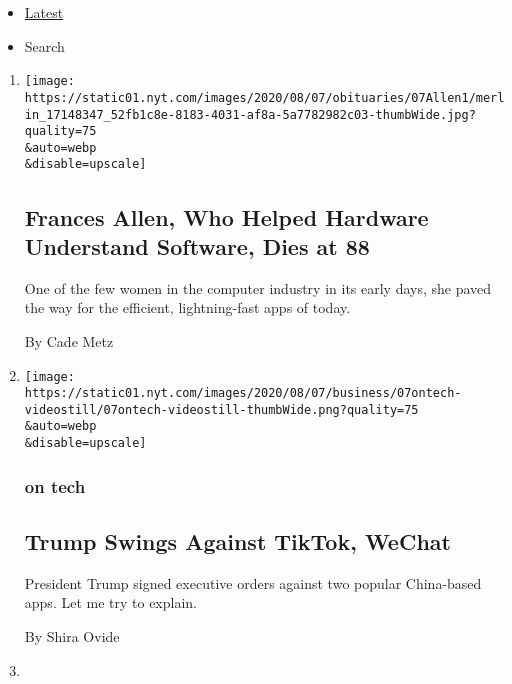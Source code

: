 \begin{itemize}
\tightlist
\item
  \protect\hyperlink{stream-panel}{Latest}
\item
  Search
\end{itemize}

\begin{enumerate}
\def\labelenumi{\arabic{enumi}.}
\item
  \href{/2020/08/08/technology/frances-allen-dead.html}{}

  \texttt{[image: https://static01.nyt.com/images/2020/08/07/obituaries/07Allen1/merlin\_17148347\_52fb1c8e-8183-4031-af8a-5a7782982c03-thumbWide.jpg?quality=75\\\&auto=webp\\\&disable=upscale]}

  \hypertarget{frances-allen-who-helped-hardware-understand-software-dies-at-88}{%
  \subsection{Frances Allen, Who Helped Hardware Understand Software,
  Dies at
  88}\label{frances-allen-who-helped-hardware-understand-software-dies-at-88}}

  One of the few women in the computer industry in its early days, she
  paved the way for the efficient, lightning-fast apps of today.

  By Cade Metz
\item
  \href{/2020/08/07/technology/trump-tiktok-wechat.html}{}

  \texttt{[image: https://static01.nyt.com/images/2020/08/07/business/07ontech-videostill/07ontech-videostill-thumbWide.png?quality=75\\\&auto=webp\\\&disable=upscale]}

  \hypertarget{on-tech}{%
  \subsubsection{on tech}\label{on-tech}}

  \hypertarget{trump-swings-against-tiktok-wechat}{%
  \subsection{Trump Swings Against TikTok,
  WeChat}\label{trump-swings-against-tiktok-wechat}}

  President Trump signed executive orders against two popular
  China-based apps. Let me try to explain.

  By Shira Ovide
\item
  \href{/2020/08/07/style/kibbo-van-life-startup.html}{}


\end{enumerate}
